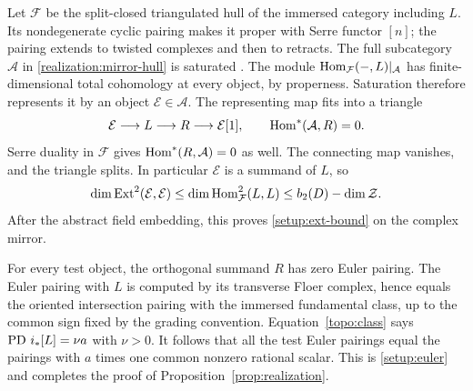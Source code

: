 Let $\mathcal F$ be the split-closed triangulated hull of the immersed
category including $L$.  Its nondegenerate cyclic pairing makes it
proper with Serre functor $[n]$; the pairing extends to twisted complexes
and then to retracts.  The full subcategory $\mathcal A$ in
\eqref{realization:mirror-hull} is saturated
\cite{BondalVanDenBergh}.  The module
$\operatorname{Hom}_{\mathcal F}(-,L)|_{\mathcal A}$ has finite-dimensional total
cohomology at every object, by properness.  Saturation therefore
represents it by an object
$\mathcal E\in\mathcal A$.  The representing map fits into a triangle
\[
 \mathcal E\longrightarrow L\longrightarrow R\longrightarrow
 \mathcal E[1],
 \qquad \operatorname{Hom}^*(\mathcal A,R)=0.
\]
Serre duality in $\mathcal F$ gives
$\operatorname{Hom}^*(R,\mathcal A)=0$ as well.  The connecting map vanishes, and the
triangle splits.  In particular $\mathcal E$ is a summand of $L$, so
\[
 \dim\operatorname{Ext}^2(\mathcal E,\mathcal E)
 \le\dim\operatorname{Hom}^2_{\mathcal F}(L,L)
 \le b_2(D)-\dim\mathcal Z.
\]
After the abstract field embedding, this proves
\eqref{setup:ext-bound} on the complex mirror.

For every test object, the orthogonal summand $R$ has zero Euler
pairing.  The Euler pairing with $L$ is computed by its transverse
Floer complex, hence equals the oriented intersection pairing with
the immersed fundamental class, up to the common sign fixed by the
grading convention.  Equation~\eqref{topo:class} says
$\operatorname{PD}\,i_*[L]=\nu a$ with $\nu>0$.  It follows that all the test Euler
pairings equal the pairings with $a$ times one common nonzero rational
scalar.  This is \eqref{setup:euler} and completes the proof of
Proposition~\ref{prop:realization}.
